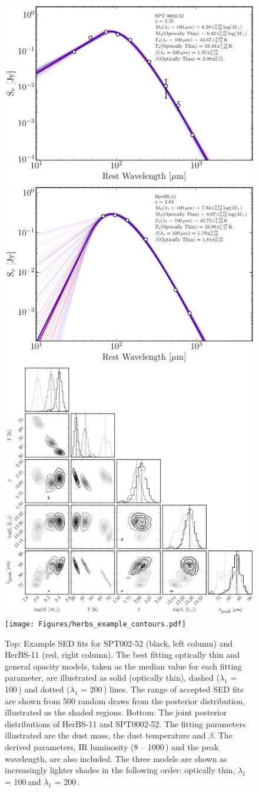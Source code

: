 \begin{figure}
	\centering
	\includegraphics[width=0.49\columnwidth]{Figures/spt_sed_example.pdf}
	\includegraphics[width=0.49\columnwidth]{Figures/herbs_sed_example.pdf}
	\includegraphics[width=0.49\columnwidth]{Figures/spt_example_contours.pdf}
	\texttt{[image: Figures/herbs\_example\_contours.pdf]}
	\caption[SED fitting and posterior distributions for SPT0002-52 and HerBS-11]{Top: Example SED fits for SPT002-52 (black, left column) and HerBS-11 (red, right column). The best fitting optically thin and general opacity models, taken as the median value for each fitting parameter, are illustrated as solid (optically thin), dashed ($\lambda_1$ = 100\,\micron) and dotted ($\lambda_1$ = 200\,\micron) lines. The range of accepted SED fits are shown from 500 random draws from the posterior distribution, illustrated as the shaded regions. Bottom: The joint posterior distributions of HerBS-11 and SPT0002-52. The fitting parameters illustrated are the dust mass, the dust temperature and $\beta$. The derived parameters, IR luminosity (8 -- 1000\,\micron) and the peak wavelength, are also included. The three models are shown as increasingly lighter shades in the following order: optically thin, $\lambda_1$ = 100\,\micron and $\lambda_1$ = 200\,\micron.}
	\label{fig:example_SEDs}
\end{figure}

